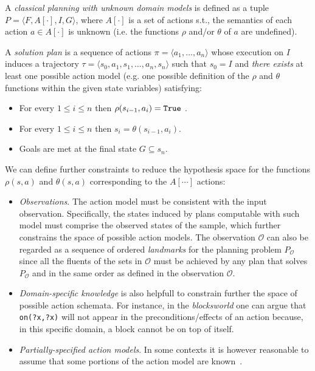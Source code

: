 \documentclass[letterpaper]{article} %
\newcommand{\tup}[1]{{\langle #1 \rangle}}
\begin{document}
A {\em classical planning with unknown domain models} is defined as a tuple $P=\tup{F,A[\cdot],I,G}$, where $A[\cdot]$ is a set of actions s.t., the semantics of each action $a\in A[\cdot]$ is unknown (i.e. the functions $\rho$ and/or $\theta$ of $a$ are undefined).

A {\em solution plan} is a sequence of actions $\pi=\tup{a_1, \ldots, a_n}$ whose execution on $I$ induces a trajectory $\tau=\tup{s_0, a_1, s_1, \ldots, a_n, s_n}$ such that $s_0=I$ and {\em there exists} at least one possible action model (e.g. one possible definition of the $\rho$ and $\theta$ functions within the given state variables) satisfying:
\begin{itemize}
\item For every {\small $1\leq i\leq n$} then $\rho(s_{i-1},a_i)={\tt\small True}$ .
\item For every {\small $1\leq i\leq n$} then $s_i=\theta(s_{i-1},a_i)$.
\item Goals are met at the final state $G\subseteq s_n$. 
\end{itemize}

We can define further constraints to reduce the hypothesis space for the functions $\rho(s,a)$ and $\theta(s,a)$ corresponding to the $A[\cdots]$ actions:
\begin{itemize}
\item {\em Observations}. The action model must be consistent with the input observation. Specifically, the states induced by plans computable with such model must comprise the observed states of the sample, which further constrains the space of possible action models. The observation $\mathcal{O}$ can also be regarded as a sequence of ordered {\em landmarks} for the planning problem $P_\mathcal{O}$~\cite{hoffmann2004ordered} since all the fluents of the sets in $\mathcal{O}$ must be achieved by any plan that solves $P_\mathcal{O}$ and in the same order as defined in the observation $\mathcal{O}$.

\item {\em Domain-specific knowledge} is also helpfull to constrain further the space of possible action schemata. For instance, in the {\em blocksworld} one can argue that {\small\tt on(?x,?x)} will not appear in the preconditions/effects of an action because, in this specific domain, a block cannot be on top of itself. 
\item {\em Partially-specified action models}. In some contexts it is however reasonable to assume that some portions of the action model are known~\cite{ZhuoNK13,sreedharan2018handling,pereira2018heuristic}.
\end{itemize}
\end{document}

